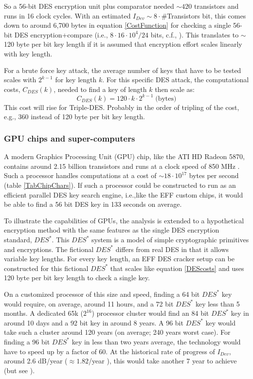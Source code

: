 \documentclass{article}
\begin{document}
So a 56-bit DES encryption unit plus comparator needed $\sim 420$ transistors and 
runs in 16 clock cycles. With an estimated $I_{Dev} \sim 8\cdot \#$Transistors  bit, this 
comes down to around 6,700 bytes in equation \ref{CostFunction} for checking a 
single 56-bit DES encryption+compare
(i.e., $8\cdot 16 \cdot 10^4/24$ bits, c.f., \cite{Son0911-5262}). This translates to 
$\sim$120 byte per bit key length if it is assumed that encryption effort scales linearly 
with key length.

For a brute force key attack, the average number of keys that have to be tested scales 
with $2^{k-1}$ for key length $k$. For this specific DES attack, the computational costs, 
$C_{DES}(k)$, needed to find a key of length $k$ then scale as:
\begin{equation}\label{DEScosts}
 C_{DES}(k) =  120 \cdot k \cdot 2^{k-1}\;\text{(bytes)}
\end{equation} 
This cost will rise for Triple-DES. Probably in the order of tripling of the cost, e.g., 360 instead
of 120 byte per bit key length.

\subsubsection{GPU chips and super-computers}\label{SectGPU}

A modern Graphics Processing Unit (GPU) chip, like the ATI HD Radeon 5870, contains 
around 2.15 billion
transistors and runs at a clock speed of 850 MHz \cite{LoydCase2009}. 
Such a processor handles computations at a cost of $\sim 18 \cdot 10^{17}$ 
bytes per second (table \ref{TabChipChars}).
If such a processor could be constructed to run as an efficient parallel DES key search engine, 
i.e.,like the EFF custom chips, it would be able to find a 56 bit DES key in 133 seconds 
on average.

To illustrate the capabilities of GPUs, the analysis is extended to a hypothetical encryption
method with the same features as the single DES encryption standard, $DES^*$.
This $DES^*$ system is a model of simple cryptographic primitives and encryptions.
The fictional $DES^*$ differs from real DES in that it allows variable key lengths.
For every key length, an EFF DES cracker setup can be constructed for this fictional 
$DES^*$ that scales like equation \ref{DEScosts} and uses 120 byte per bit key length 
to check a single key.

On a customized processor of this size and speed, finding a 64 bit $DES^*$ key would 
require, on average, around 11 hours, and a 72 bit $DES^*$  key less than 5 months. A 
dedicated 65k ($2^{16}$) processor cluster would find an 84 bit $DES^*$  key in 
around 10 days and a 92 bit key in around 8 years. A 96 bit $DES^*$  key would take 
such a cluster around 120 years (on average; 240 years worst case). For 
finding a 96 bit $DES^*$  key in less than two years average, the technology would 
have to speed up by a factor of 60. At the historical rate of progress of $I_{Dev}$, 
around 2.6 dB/year ($\approx 1.82$/year \cite{Son0911-5262}), this would take another 
7 year to achieve (but see \cite{tuomi2002lives}).
\end{document}

